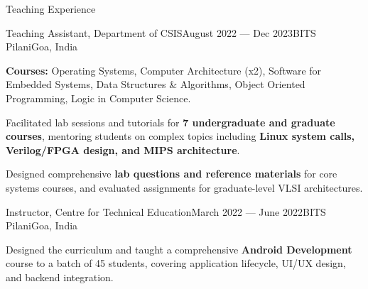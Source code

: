 
\begin{rSection}{Teaching Experience}

    \begin{rSubsection}{Teaching Assistant, Department of CSIS}{August 2022 --- Dec 2023}{BITS Pilani}{Goa, India}
        \item \textbf{Courses:} Operating Systems, Computer Architecture (x2), Software for Embedded Systems, Data Structures \& Algorithms, Object Oriented Programming, Logic in Computer Science.
        \item Facilitated lab sessions and tutorials for \textbf{7 undergraduate and graduate courses}, mentoring students on complex topics including \textbf{Linux system calls, Verilog/FPGA design, and MIPS architecture}.
        \item Designed comprehensive \textbf{lab questions and reference materials} for core systems courses, and evaluated assignments for graduate-level VLSI architectures.
    \end{rSubsection}

    \begin{rSubsection}{Instructor, Centre for Technical Education}{March 2022 --- June 2022}{BITS Pilani}{Goa, India}
        \item Designed the curriculum and taught a comprehensive \textbf{Android Development} course to a batch of 45 students, covering application lifecycle, UI/UX design, and backend integration.
    \end{rSubsection}

\end{rSection}